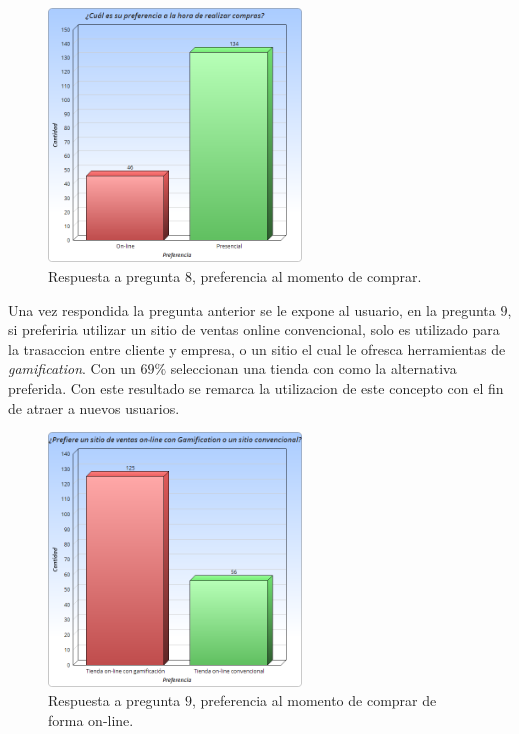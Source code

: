 \begin{figure}[!htb]
  \centering
  \includegraphics[width=0.6\textwidth]{images/Graficos/graf_5_9.png}
  \caption[chart5.9]{Respuesta a pregunta $8$, preferencia al momento de comprar.}
  \label{fig:chart5.9}
\end{figure}

Una vez respondida la pregunta anterior se le expone al usuario, en la pregunta $9$, si preferiria
utilizar un sitio de ventas online convencional, solo es utilizado para la trasaccion entre cliente
y empresa, o un sitio el cual le ofresca herramientas de \emph{gamification}. Con un $69\%$ seleccionan
una tienda con {\GAM} como la alternativa preferida. Con este resultado se remarca la
utilizacion de este concepto con el fin de atraer a nuevos usuarios.

\begin{figure}[!htb]
  \centering
  \includegraphics[width=0.6\textwidth]{images/Graficos/graf_5_10.png}
  \caption[chart5.10]{Respuesta a pregunta $9$, preferencia al momento de comprar de forma on-line.}
  \label{fig:chart5.10}
\end{figure}


